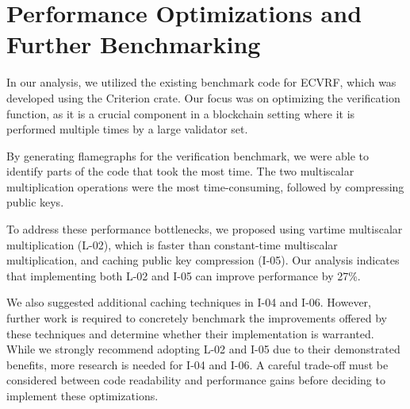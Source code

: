 \section{Performance Optimizations and Further Benchmarking}
In our analysis, we utilized the existing benchmark code for ECVRF, which was developed using the Criterion crate. Our focus was on optimizing the verification function, as it is a crucial component in a blockchain setting where it is performed multiple times by a large validator set.

By generating flamegraphs for the verification benchmark, we were able to identify parts of the code that took the most time. The two multiscalar multiplication operations were the most time-consuming, followed by compressing public keys.

To address these performance bottlenecks, we proposed using vartime multiscalar multiplication (L-02), which is faster than constant-time multiscalar multiplication, and caching public key compression (I-05). Our analysis indicates that implementing both L-02 and I-05 can improve performance by 27\%.

We also suggested additional caching techniques in I-04 and I-06. However, further work is required to concretely benchmark the improvements offered by these techniques and determine whether their implementation is warranted. While we strongly recommend adopting L-02 and I-05 due to their demonstrated benefits, more research is needed for I-04 and I-06. A careful trade-off must be considered between code readability and performance gains before deciding to implement these optimizations.